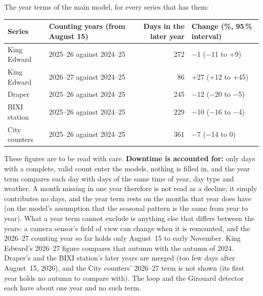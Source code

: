 \documentclass[11pt,a4paper]{article}
\begin{document}
The year terms of the main model, for every series that has them:
\begin{center}\small\begin{tabular}{@{}llrp{4.2cm}@{}}\toprule
Series & Counting years (from August 15) & Days in the later year & Change (\%, 95\,\% interval)\\\midrule
King Edward & 2025--26 against 2024--25 & 272 & $-$1 ($-$11 to +9) \\
King Edward & 2026--27 against 2024--25 & 86 & +27 (+12 to +45) \\
Draper & 2025--26 against 2024--25 & 245 & $-$12 ($-$20 to $-$5) \\
BIXI station & 2025--26 against 2024--25 & 229 & $-$10 ($-$16 to $-$4) \\
City counters & 2025--26 against 2024--25 & 361 & $-$7 ($-$14 to 0) \\
\bottomrule\end{tabular}\end{center}
These figures are to be read with care. \textbf{Downtime is accounted for:} only days with a complete, valid count enter the models, nothing is filled in, and the year term compares each day with days of the same time of year, day type and weather. A month missing in one year therefore is not read as a decline; it simply contributes no days, and the year term rests on the months that year does have (on the model\textquoteright{}s assumption that the seasonal pattern is the same from year to year). What a year term cannot exclude is anything else that differs between the years: a camera sensor\textquoteright{}s field of view can change when it is remounted, and the 2026--27 counting year so far holds only August~15 to early November. King Edward\textquoteright{}s 2026--27 figure compares that autumn with the autumn of 2024. Draper\textquoteright{}s and the BIXI station\textquoteright{}s later years are merged (too few days after August~15, 2026), and the City counters\textquoteright{} 2026--27 term is not shown (its first year holds no autumn to compare with). The loop and the Girouard detector each have about one year and no such term.
\end{document}
